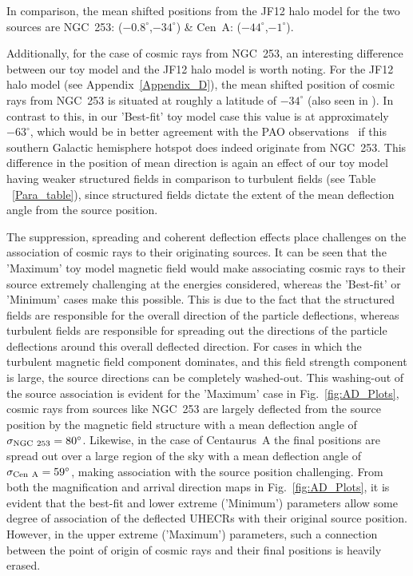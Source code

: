 \documentclass[usenatbib]{mnras}
\begin{document}
In comparison, the mean shifted positions from the JF12 halo model for the two sources are  NGC~253: ($-0.8^{\circ}$,$-34^{\circ}$) \& Cen~A: ($-44^{\circ}$,$-1^{\circ}$).

Additionally, for the case of cosmic rays from NGC~253, an interesting difference between our toy model and the JF12 halo model is worth noting. For the JF12 halo model (see Appendix~\ref{Appendix_D}), the mean shifted position of cosmic rays from NGC~253 is situated at roughly a latitude of $-34^{\circ}$ (also seen in \citet{Arjen_2021}). In contrast to this, in our 'Best-fit' toy model case this value is at approximately $-63^{\circ}$, which would be in better agreement with the PAO observations~\citep{Auger_Starburst2018} if this southern Galactic hemisphere hotspot does indeed originate from NGC~253. This difference in the position of mean direction is again an effect of our toy model having weaker structured fields in comparison to turbulent fields (see Table ~\ref{Para_table}), since structured fields dictate the extent of the mean deflection angle from the source position. 

The suppression, spreading and coherent deflection effects place challenges on the association of cosmic rays to their originating sources. It can be seen that the 'Maximum' toy model magnetic field would make associating cosmic rays to their source extremely challenging at the energies considered, whereas the 'Best-fit' or 'Minimum' cases make this possible. This is due to the fact that the structured fields are responsible for the overall direction of the particle deflections, whereas turbulent fields are responsible for spreading out the directions of the particle deflections around this overall deflected direction. For cases in which the turbulent magnetic field component dominates, and this field strength component is large, the source directions can be completely washed-out. This washing-out of the source association is evident for the 'Maximum' case in Fig.~\ref{fig:AD_Plots}, cosmic rays from sources like NGC~253 are largely deflected from the source position by the magnetic field structure with a mean deflection angle of $\sigma_{\rm NGC~253} = 80^{\circ}$. Likewise, in the case of Centaurus~A the final positions are spread out over a large region of the sky with a mean deflection angle of $\sigma_{\rm Cen~A} = 59^{\circ}$, making association with the source position challenging. From both the magnification and arrival direction maps in Fig.~\ref{fig:AD_Plots}, it is evident that the best-fit and lower extreme ('Minimum') parameters allow some degree of association of the deflected UHECRs with their original source position. However, in the upper extreme ('Maximum') parameters, such a connection between the point of origin of cosmic rays and their final positions is heavily erased. 
\end{document}

